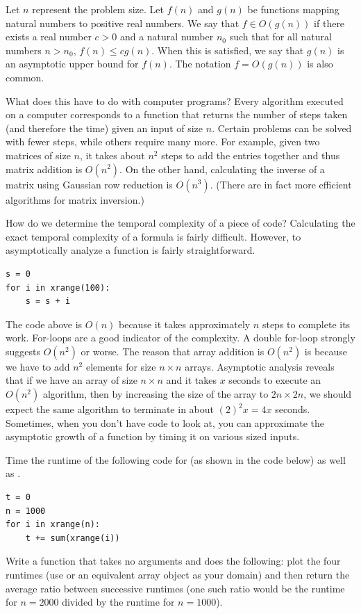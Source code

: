 \begin{definition}
Let $n$ represent the problem size.  Let $f(n)$ and $g(n)$ be functions mapping natural numbers to positive real numbers. We say that $f \in O(g(n))$ if there exists a real
number $c > 0$ and a natural number $n_0$ such that for all natural numbers $n > n_0$,
$f(n) \leq cg(n)$.
When this is satisfied, we say that $g(n)$ is an asymptotic upper bound for $f(n)$.
The notation $f = O(g(n))$ is also common.
\end{definition}

What does this have to do with computer programs?
Every algorithm executed on a computer corresponds to a function
that returns the number of steps taken (and therefore the time)
given an input of size $n$.  Certain problems can be solved with fewer steps,
while others require many more.  For example, given two matrices of size $n$,
it takes about $n^2$ steps to add the entries together and thus matrix addition is $O(n^2)$.
On the other hand, calculating the inverse of a matrix using Gaussian
row reduction is $O(n^3)$. (There are in fact more efficient
algorithms for matrix inversion.)

How do we determine the temporal complexity of a piece of code?
Calculating the exact temporal complexity of a formula is fairly difficult.
However, to asymptotically analyze a function is fairly straightforward.
\begin{lstlisting}
s = 0
for i in xrange(100):
    s = s + i
\end{lstlisting}
The code above is $O(n)$ because it takes approximately $n$ steps to complete its work.
For-loops are a good indicator of the complexity.  A double for-loop strongly suggests
$O(n^2)$ or worse.  The reason that array addition is $O(n^2)$ is because we have to add
$n^2$ elements for size $n \times n$ arrays.  Asymptotic analysis reveals that
if we have an array of size $n \times n$ and it takes $x$ seconds to execute an $O(n^2)$ algorithm,
then by increasing the size of the array to $2n \times 2n$, we should expect the same algorithm
to terminate in about $(2)^2 x = 4x$ seconds.  Sometimes, when you don't have code to look at,
you can approximate the asymptotic growth of a function by timing it on various sized inputs.

\begin{problem}
Time the runtime of the following code for  (as shown in the code below) as well
as .
\begin{lstlisting}
t = 0
n = 1000
for i in xrange(n):
    t += sum(xrange(i))
\end{lstlisting}
Write a function that takes no arguments and does the following: plot the four runtimes
(use \li{[1000, 2000, 4000, 8000]} or an equivalent array object as your domain) and
then return the average ratio between successive runtimes (one such ratio would be
the runtime for $n = 2000$ divided by the runtime for $n = 1000$).
\end{problem}

